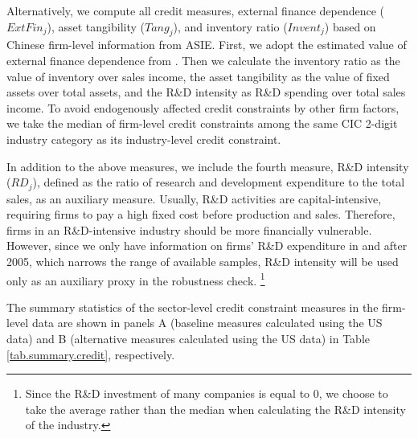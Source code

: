 Alternatively, we compute all credit measures, external finance dependence ($ExtFin_j$), asset tangibility ($Tang_j$), and inventory ratio ($Invent_j$) based on Chinese firm-level information from ASIE. First, we adopt the estimated value of external finance dependence from \cite{fan-lai-li2015}. Then we calculate the inventory ratio as the value of inventory over sales income, the asset tangibility as the value of fixed assets over total assets, and the R\&D intensity as R\&D spending over total sales income. To avoid endogenously affected credit constraints by other firm factors, we take the median of firm-level credit constraints among the same CIC 2-digit industry category as its industry-level credit constraint. 

In addition to the above measures, we include the fourth measure, R\&D intensity ($RD_j$), defined as the ratio of research and development expenditure to the total sales, as an auxiliary measure. Usually, R\&D activities are capital-intensive, requiring firms to pay a high fixed cost before production and sales. Therefore, firms in an R\&D-intensive industry should be more financially vulnerable. However, since we only have information on firms' R\&D expenditure in and after 2005, which narrows the range of available samples, R\&D intensity will be used only as an auxiliary proxy in the robustness check. \footnote{Since the R\&D investment of many companies is equal to 0, we choose to take the average rather than the median when calculating the R\&D intensity of the industry.}

The summary statistics of the sector-level credit constraint measures in the firm-level data are shown in panels A (baseline measures calculated using the US data) and B (alternative measures calculated using the US data) in Table \ref{tab.summary.credit}, respectively.

